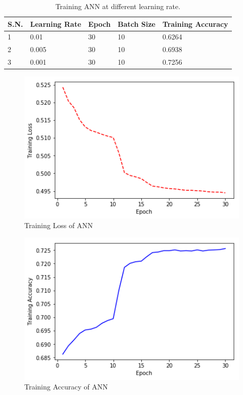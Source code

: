 \begin{table}[tbh]
\begin{center}
\begin{tabular}{|l|l|l|l|l|}
\hline
\textbf{S.N.} & \textbf{Learning Rate} & \textbf{Epoch} & \textbf{Batch Size} & \textbf{Training Accuracy} \\ \hline
1             & 0.01            & 30             & 10                  & 0.6264                     \\ \hline
2             & 0.005           & 30             & 10                  & 0.6938                     \\ \hline
3             & 0.001           & 30             & 10                  & 0.7256                     \\ \hline
\end{tabular}
\end{center}
\caption{Training \ac{ANN} at different learning rate.}
\end{table}

\begin{figure}[tbh]
\begin{center}
	\includegraphics[width = 4.5in]{images/loss.png}
	\caption{Training Loss of ANN} %
\end{center}
\end{figure}

\begin{figure}[tbh]
\begin{center}
	\includegraphics[width = 4.5in]{images/accuracy.png}
	\caption{Training Accuracy of ANN} %
\end{center}
\end{figure}

